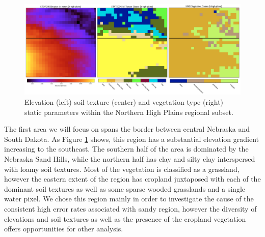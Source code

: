 \begin{figure}[h!]
    \centering

    \includegraphics[width=.99\linewidth,draft=false]{figures/lt-static/static_all-3_high-plains.png}

    \caption{Elevation (left) soil texture (center) and vegetation type (right) static parameters within the Northern High Plains regional subset.}
    \label{lt_static_high-plains}
\end{figure}

The first area we will focus on spans the border between central Nebraska and South Dakota. As Figure \ref{lt_static_high-plains} shows, this region has a substantial elevation gradient increasing to the southeast. The southern half of the area is dominated by the Nebraska Sand Hills, while the northern half has clay and silty clay interspersed with loamy soil textures. Most of the vegetation is classified as a grassland, however the eastern extent of the region has cropland juxtaposed with each of the dominant soil textures as well as some sparse wooded grasslands and a single water pixel. We chose this region mainly in order to investigate the cause of the consistent high error rates associated with sandy region, however the diversity of elevations and soil textures as well as the presence of the cropland vegetation offers opportunities for other analysis.

